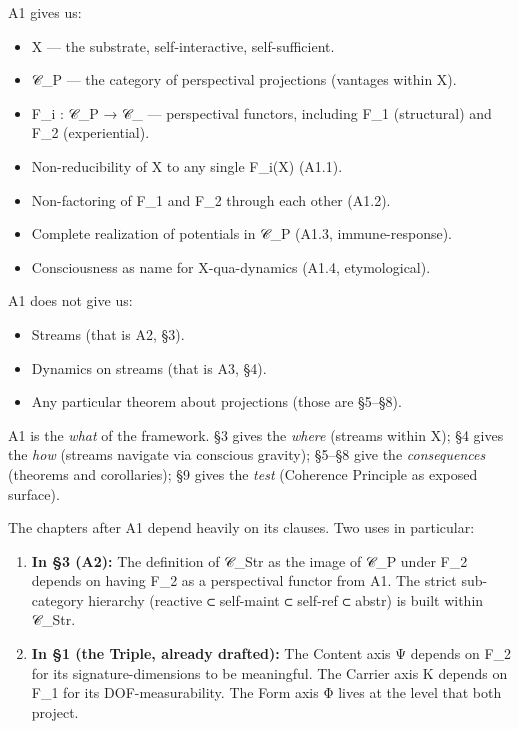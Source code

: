 \documentclass[11pt, openany]{book}
\begin{document}
A1 gives us:
\begin{itemize}
\item X --- the substrate, self-interactive, self-sufficient.
\item 𝒞\_\allowbreak{}P --- the category of perspectival projections (vantages within X).
\item F\_\allowbreak{}i : 𝒞\_\allowbreak{}P → 𝒞\_ --- perspectival functors, including F\_\allowbreak{}1 (structural) and F\_\allowbreak{}2 (experiential).
\item Non-reducibility of X to any single F\_\allowbreak{}i(X) (A1.1).
\item Non-factoring of F\_\allowbreak{}1 and F\_\allowbreak{}2 through each other (A1.2).
\item Complete realization of potentials in 𝒞\_\allowbreak{}P (A1.3, immune-response).
\item Consciousness as name for X-qua-dynamics (A1.4, etymological).
\end{itemize}

A1 does not give us:
\begin{itemize}
\item Streams (that is A2, §3).
\item Dynamics on streams (that is A3, §4).
\item Any particular theorem about projections (those are §5–§8).
\end{itemize}

A1 is the \textit{what} of the framework. §3 gives the \textit{where} (streams within X); §4 gives the \textit{how} (streams navigate via conscious gravity); §5–§8 give the \textit{consequences} (theorems and corollaries); §9 gives the \textit{test} (Coherence Principle as exposed surface).

The chapters after A1 depend heavily on its clauses. Two uses in particular:

\begin{enumerate}
\item \textbf{In §3 (A2):} The definition of 𝒞\_\allowbreak{}Str as the image of 𝒞\_\allowbreak{}P under F\_\allowbreak{}2 depends on having F\_\allowbreak{}2 as a perspectival functor from A1. The strict sub-category hierarchy (reactive ⊂ self-maint ⊂ self-ref ⊂ abstr) is built within 𝒞\_\allowbreak{}Str.
\item \textbf{In §1 (the Triple, already drafted):} The Content axis Ψ depends on F\_\allowbreak{}2 for its signature-dimensions to be meaningful. The Carrier axis K depends on F\_\allowbreak{}1 for its DOF-measurability. The Form axis Φ lives at the level that both project.
\end{enumerate}
\end{document}
